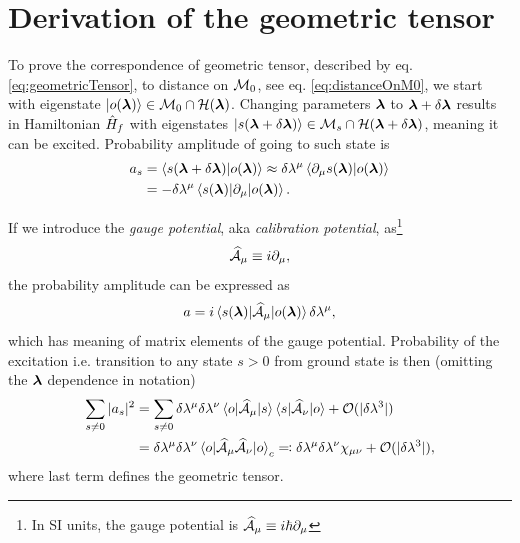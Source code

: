 \section{Derivation of the geometric tensor}
To prove the correspondence of geometric tensor, described by eq. \ref{eq:geometricTensor}, to distance on $\M_0$, see eq. \ref{eq:distanceOnM0}, we start with eigenstate $\ket{o(\llambda)}\in \M_0\cap \H(\llambda)$. Changing parameters $\llambda$ to $\llambda+\delta \llambda$ results in Hamiltonian $\HH_f$ with eigenstates $\ket{s(\llambda+\delta \llambda)}\in \M_s\cap\H(\llambda+\delta \llambda)$, meaning it can be excited. Probability amplitude of going to such state is
\begin{equation}
    \begin{split}
        a_s&=\braket{s(\llambda+\delta\llambda)|o(\llambda)}\approx \delta\lambda^\mu\braket{\partial_\mu s(\llambda)|o(\llambda)} \\
        &= -\delta\lambda^\mu\braket{s(\llambda)|\partial_\mu|o(\llambda)}.
    \end{split}
\end{equation}

If we introduce the \emph{gauge potential}, aka \emph{calibration potential}, as\footnote{In SI units, the gauge potential is $\AA_\mu\equiv i\hbar\partial_{\mu}$}
\begin{equation}
    \AA_\mu\equiv i\partial_{\mu},
\end{equation}
the probability amplitude can be expressed as
\begin{equation}
   a=i\braket{s(\llambda)|\AA_\mu |o(\llambda)}\delta\lambda^\mu,
\end{equation}
which has meaning of matrix elements of the gauge potential. Probability of the excitation i.e. transition to any state $s>0$ from ground state is then (omitting the $\llambda$ dependence in notation)
\begin{equation}
    \begin{split}
        \sum_{s\neq 0}|a_s|^2&=  \sum_{s\neq 0} \delta \lambda^\mu \delta \lambda^\nu\braket{o|\AA_\mu|s}\braket{s|\AA_\nu|o}+\O(|\delta \lambda^3|) \\
        &= \delta \lambda^\mu \delta \lambda^\nu\braket{o|\AA_\mu \AA_\nu|o}_c\eqqcolon \delta \lambda^\mu \delta \lambda^\nu\chi_{\mu\nu}+\O(|\delta \lambda^3|),
    \end{split}
\end{equation}
where last term defines the geometric tensor.

